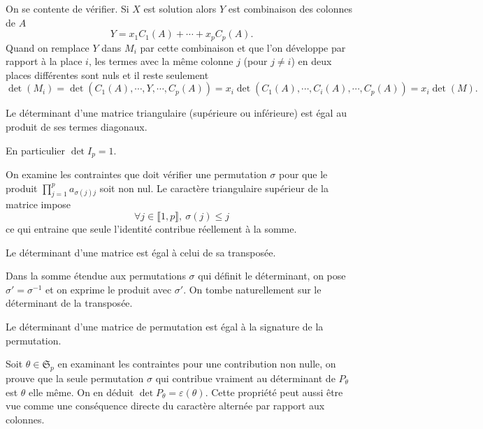 \begin{demo}
  On se contente de vérifier. Si $X$ est solution alors $Y$ est combinaison des colonnes de $A$
\[
  Y = x_1C_1(A) + \cdots + x_p C_p(A).
\]
Quand on remplace $Y$ dans $M_i$ par cette combinaison et que l'on développe par rapport à la place $i$, les termes avec la même colonne $j$ (pour $j \neq i$) en deux places différentes sont nuls et il reste seulement
\[
  \det(M_i) = \det(C_1(A),\cdots,Y,\cdots,C_p(A)) = x_i \det(C_1(A),\cdots,C_i(A),\cdots,C_p(A)) = x_i \det(M).
\]
\end{demo}

\begin{propn}
Le déterminant d'une matrice triangulaire (supérieure ou inférieure) est égal au produit de ses termes diagonaux.
\end{propn}
\begin{rem}
En particulier $\det I_p=1$.  
\end{rem}
\begin{demo}
  On examine les contraintes que doit vérifier une permutation $\sigma$ pour que le produit $\prod_{j=1}^{p}a_{\sigma(j)j}$ soit non nul. Le caractère triangulaire supérieur de la matrice impose
\[
  \forall j \in \llbracket 1, p \rrbracket, \: \sigma(j) \leq j
\]
ce qui entraine que seule l'identité contribue réellement à la somme.
\end{demo}


\begin{propn}
 Le déterminant d'une matrice est égal à celui de sa transposée.
\end{propn}
\begin{demo}
  Dans la somme étendue aux permutations $\sigma$ qui définit le déterminant, on pose $\sigma' = \sigma^{-1}$ et on exprime le produit avec $\sigma'$. On tombe naturellement sur le déterminant de la transposée.
\end{demo}

\begin{propn}
Le déterminant d'une matrice de permutation est égal à la signature de la permutation.  
\end{propn}
\begin{demo}
  Soit $\theta \in \mathfrak{S}_p$ en examinant les contraintes pour une contribution non nulle, on prouve que la seule permutation $\sigma$ qui contribue vraiment au déterminant de $P_\theta$ est $\theta$ elle même. On en déduit $\det P_\theta = \varepsilon(\theta)$. Cette propriété peut aussi être vue comme une conséquence directe du caractère alternée par rapport aux colonnes.
\end{demo}


